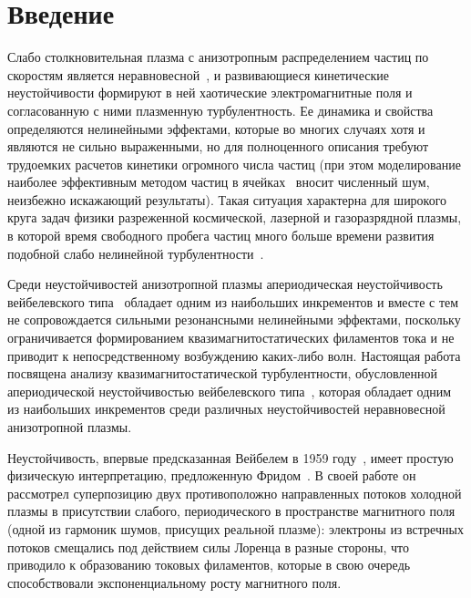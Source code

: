 \chapter*{Введение}                         %
\newcommand{\me}{m_\mathrm{e}}
\newcommand{\wpl}{\omega_\mathrm{p}}

Слабо столкновительная плазма с анизотропным распределением частиц по скоростям является неравновесной~\cite{Mikhailovsky1971,Krall1973}, и развивающиеся кинетические неустойчивости формируют в ней хаотические электромагнитные поля и согласованную с ними плазменную турбулентность.
Ее динамика и свойства определяются нелинейными эффектами, которые во многих случаях хотя и являются не сильно выраженными, но для полноценного описания требуют трудоемких расчетов кинетики огромного числа частиц (при этом моделирование наиболее эффективным методом частиц в ячейках~\cite{Kato2005,Borodachev2010,Ruyer2015,Lazar2022,Borodachev2016_Radiofiz,Romanov2004} вносит численный шум, неизбежно искажающий результаты).
Такая ситуация характерна для широкого круга задач физики разреженной космической, лазерной и газоразрядной плазмы, в которой время свободного пробега частиц много больше времени развития подобной слабо нелинейной турбулентности~\cite{Baumjohann2012,Treumann2009,Marcowith2016,Gary1993}. 

Среди неустойчивостей анизотропной плазмы апериодическая неустойчивость вейбелевского типа~\cite{Weibel1959,Zhou2022,Fried1959,Kalman1968,Morse1971,Kocharovsky2016,Lazar2006,Stockem2009,SchaeferRolffs2006} обладает одним из наибольших инкрементов и вместе с тем не сопровождается сильными резонансными нелинейными эффектами, поскольку ограничивается формированием квазимагнитостатических филаментов тока и не приводит к непосредственному возбуждению каких-либо волн.
Настоящая работа посвящена анализу квазимагнитостатической турбулентности, обусловленной апериодической неустойчивостью вейбелевского типа~\cite{Weibel1959, Fried1959, Kocharovsky2016}, которая обладает одним из наибольших инкрементов среди различных неустойчивостей неравновесной анизотропной плазмы. 

Неустойчивость, впервые предсказанная Вейбелем в 1959 году~\cite{Weibel1959}, имеет простую физическую интерпретацию, предложенную Фридом~\cite{Fried1959}. В своей работе он рассмотрел суперпозицию двух противоположно направленных потоков холодной плазмы в присутствии слабого, периодического в пространстве магнитного поля (одной из гармоник шумов, присущих реальной плазме): электроны из встречных потоков смещались под действием силы Лоренца в разные стороны, что приводило к образованию токовых филаментов, которые в свою очередь способствовали экспоненциальному росту магнитного поля. 

